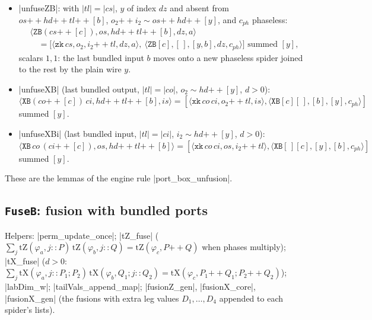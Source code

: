 \begin{lemma}
\begin{itemize}
\item \lean|unfuseZB|: with $|tl|=|cs|$, $y$ of index $dz$ and absent from
  $os\mathbin{+\!\!+}hd\mathbin{+\!\!+}tl\mathbin{+\!\!+}[b]$, $o_2\mathbin{+\!\!+}i_2\sim os\mathbin{+\!\!+}hd\mathbin{+\!\!+}[y]$, and
  $c_{ph}$ phaseless:
  \[\begin{aligned}&\langle \mathtt{ZB}(cs\mathbin{+\!\!+}[c]),os,hd\mathbin{+\!\!+}tl\mathbin{+\!\!+}[b],dz,a\rangle\\
  &\quad=\bigl[\langle \mathtt{zk}\,cs,o_2,i_2\mathbin{+\!\!+}tl,dz,a\rangle,\ \langle\mathtt{ZB}[c],[\,],[y,b],dz,c_{ph}\rangle\bigr]
  \text{ summed }[y],\end{aligned}\]
  scalars $1,1$: the last bundled input $b$ moves onto a new phaseless spider joined to the rest by
  the plain wire $y$.
\item \lean|unfuseXB| (last bundled output, $|tl|=|co|$, $o_2\sim hd\mathbin{+\!\!+}[y]$, $d>0$):
  $\langle\mathtt{XB}(co\mathbin{+\!\!+}[c])\,ci,hd\mathbin{+\!\!+}tl\mathbin{+\!\!+}[b],is\rangle=
  [\langle\mathtt{xk}\,co\,ci,o_2\mathbin{+\!\!+}tl,is\rangle,\langle\mathtt{XB}[c][\,],[b],[y],c_{ph}\rangle]$
  summed $[y]$.
\item \lean|unfuseXBi| (last bundled input, $|tl|=|ci|$, $i_2\sim hd\mathbin{+\!\!+}[y]$, $d>0$):
  $\langle\mathtt{XB}\,co\,(ci\mathbin{+\!\!+}[c]),os,hd\mathbin{+\!\!+}tl\mathbin{+\!\!+}[b]\rangle=
  [\langle\mathtt{xk}\,co\,ci,os,i_2\mathbin{+\!\!+}tl\rangle,\langle\mathtt{XB}[\,][c],[y],[b],c_{ph}\rangle]$
  summed $[y]$.
\end{itemize}
These are the lemmas of the engine rule \code|port_box_unfusion|.
\end{lemma}

\subsection{\texttt{FuseB}: fusion with bundled ports}

Helpers: \lean|perm_update_once|; \lean|tZ_fuse|
($\sum_j\mathrm{tZ}(\varphi_a,j{::}P)\,\mathrm{tZ}(\varphi_b,j{::}Q)=\mathrm{tZ}(\varphi_c,P\mathbin{+\!\!+}Q)$ when phases
multiply); \lean|tX_fuse| ($d>0$: $\sum_j\mathrm{tX}(\varphi_a,j{::}P_1;P_2)\,\mathrm{tX}(\varphi_b,Q_1;j{::}Q_2)=
\mathrm{tX}(\varphi_c,P_1\mathbin{+\!\!+}Q_1;P_2\mathbin{+\!\!+}Q_2)$); \lean|labDim_w|; \lean|tailVals_append_map|;
\lean|fusionZ_gen|, \lean|fusionX_core|, \lean|fusionX_gen| (the fusions with extra leg values
$D_1,\dots,D_4$ appended to each spider's lists).

